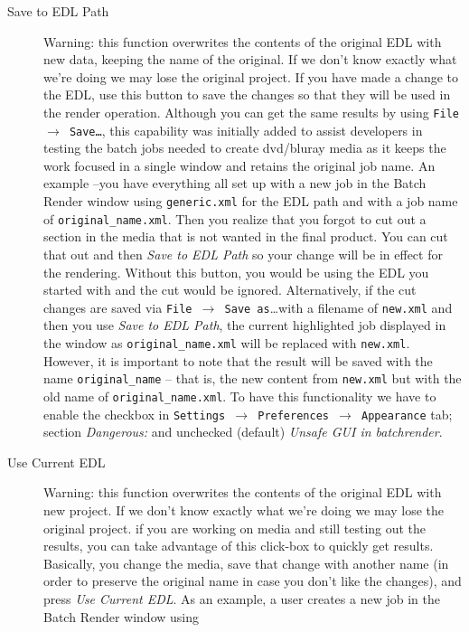 \begin{description}
\item[Save to EDL Path] Warning: this function overwrites the contents of the original EDL with new data, keeping the name of the original. If we don't know exactly what we're doing we may lose the original project. If you have made a change to the EDL, use
  this button to save the changes so that they will be used in the
  render operation.  Although you can get the same results by using
  \texttt{File $\rightarrow$ Save\dots}, this capability was initially
  added to assist developers in testing the batch jobs needed to
  create dvd/bluray media as it keeps the work focused in a single
  window and retains the original job name.  An example --you have
  everything all set up with a new job in the Batch Render window
  using \texttt{generic.xml} for the EDL path and with a job name of
  \texttt{original\_name.xml}.  Then you realize that you forgot to
  cut out a section in the media that is not wanted in the final
  product.  You can cut that out and then \textit{Save to EDL Path} so
  your change will be in effect for the rendering.  Without this
  button, you would be using the EDL you started with and the cut
  would be ignored.  Alternatively, if the cut changes are saved via
  \texttt{File $\rightarrow$ Save as}\dots with a filename of
  \texttt{new.xml} and then you use \textit{Save to EDL Path}, the
  current highlighted job displayed in the window as
  \texttt{original\_name.xml} will be replaced with \texttt{new.xml}.
  However, it is important to note that the result will be saved with
  the name \texttt{original\_name} – that is, the new content from
  \texttt{new.xml} but with the old name of
  \texttt{original\_name.xml}. To have this functionality we have to enable the checkbox in \texttt{Settings $\rightarrow$ Preferences $\rightarrow$ Appearance} tab; section \textit{Dangerous:} and unchecked (default) \textit{Unsafe GUI in batchrender}.
\item[Use Current EDL] Warning: this function overwrites the contents of the original EDL with new project. If we don't know exactly what we're doing we may lose the original project. if you are working on media and still testing
  out the results, you can take advantage of this click-box to quickly
  get results.  Basically, you change the media, save that change with
  another name (in order to preserve the original name in case you
  don't like the changes), and press \textit{Use Current EDL}.  As an
  example, a user creates a new job in the Batch Render window using

\end{description}
